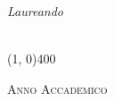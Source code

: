 \begin{titlepage}
\begin{center}
\begin{minipage}[t]{0.47\textwidth}
\end{minipage}
\hfill
\begin{minipage}[t]{0.47\textwidth}\raggedleft
{\large{
\textit{Laureando}\\
\myName}} \\
\myID
\end{minipage}

\vspace{10pt}

\vspace{0pt}

\line(1, 0){400} \\
\begin{normalsize}
\textsc{Anno Accademico \myAA}
\end{normalsize}

\end{center}
\end{titlepage} 